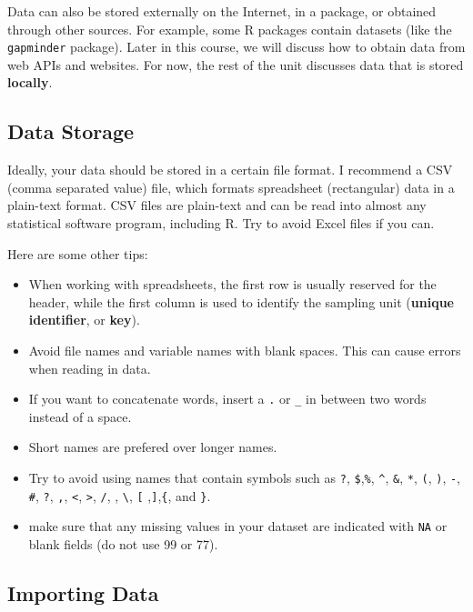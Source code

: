 \documentclass[
]{book}
\providecommand{\tightlist}{%
  \setlength{\itemsep}{0pt}\setlength{\parskip}{0pt}}
\begin{document}
Data can also be stored externally on the Internet, in a package, or obtained through other sources. For example, some R packages contain datasets (like the \texttt{gapminder} package). Later in this course, we will discuss how to obtain data from web APIs and websites. For now, the rest of the unit discusses data that is stored \textbf{locally}.

\hypertarget{data-storage}{%
\subsection{Data Storage}\label{data-storage}}

Ideally, your data should be stored in a certain file format. I recommend a CSV (comma separated value) file, which formats spreadsheet (rectangular) data in a plain-text format. CSV files are plain-text and can be read into almost any statistical software program, including R. Try to avoid Excel files if you can.

Here are some other tips:

\begin{itemize}
\tightlist
\item
  When working with spreadsheets, the first row is usually reserved for the header, while the first column is used to identify the sampling unit (\textbf{unique identifier}, or \textbf{key}).
\item
  Avoid file names and variable names with blank spaces. This can cause errors when reading in data.
\item
  If you want to concatenate words, insert a \texttt{.} or \texttt{\_} in between two words instead of a space.
\item
  Short names are prefered over longer names.
\item
  Try to avoid using names that contain symbols such as \texttt{?}, \texttt{\$},\texttt{\%}, \texttt{\^{}}, \texttt{\&}, \texttt{*}, \texttt{(}, \texttt{)}, \texttt{-}, \texttt{\#}, \texttt{?}, \texttt{,}, \texttt{\textless{}}, \texttt{\textgreater{}}, \texttt{/}, \texttt{\textbar{}}, \texttt{\textbackslash{}}, \texttt{{[}} ,\texttt{{]}},\texttt{\{}, and \texttt{\}}.
\item
  make sure that any missing values in your dataset are indicated with \texttt{NA} or blank fields (do not use 99 or 77).
\end{itemize}

\hypertarget{importing-data}{%
\subsection{Importing Data}\label{importing-data}}
\end{document}
